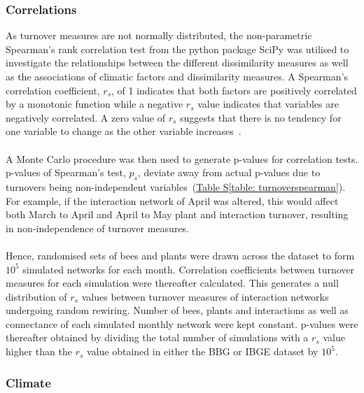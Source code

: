 \documentclass[11pt]{article}
\begin{document}
\vspace{0.2cm}
\subsubsection{Correlations}
As turnover measures are not normally distributed, the non-parametric Spearman's rank correlation test from the python package SciPy was utilised to investigate the relationships between the different dissimilarity measures as well as the associations of climatic factors and dissimilarity measures. A Spearman's correlation coefficient, $r_{s}$, of 1 indicates that both factors are positively correlated by a monotonic function while a negative $r_{s}$ value indicates that variables are negatively correlated. A zero value of $r_{s}$ suggests that there is no tendency for one variable to change as the other variable increases~\citep{Dehmer2011}. \\
\\
A Monte Carlo procedure was then used to generate p-values for correlation tests. p-values of Spearman's test, $p_{s}$, deviate away from actual p-values due to turnovers being non-independent variables~(\hyperref[table: turnoverspearman]{Table S\ref{table: turnoverspearman}}). For example, if the interaction network of April was altered, this would affect both March to April and April to May plant and interaction turnover, resulting in non-independence of turnover measures.\\
\\
Hence, randomised sets of bees and plants were drawn across the dataset to form $10^{5}$ simulated networks for each month. Correlation coefficients between turnover measures for each simulation were thereafter calculated. This generates a null distribution of $r_{s}$ values between turnover measures of interaction networks undergoing random rewiring. Number of bees, plants and interactions as well as connectance of each simulated monthly network were kept constant. p-values were thereafter obtained by dividing the total number of simulations with a $r_{s}$ value higher than the $r_{s}$ value obtained in either the BBG or IBGE dataset by $10^{5}$.

\subsubsection{Climate}
\end{document}
